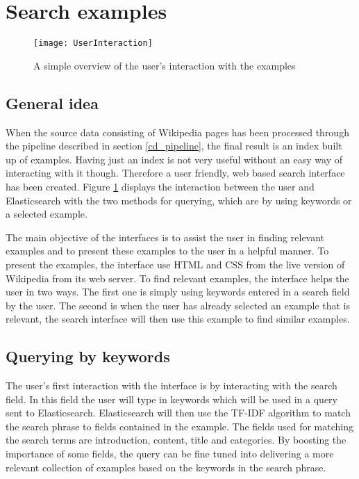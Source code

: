 \section{Search examples}
\begin{figure}[h]
\caption{A simple overview of the user's interaction with the examples}
\texttt{[image: UserInteraction]}
\label{fig:ui}
\end{figure}

\subsection{General idea}
When the source data consisting of Wikipedia pages has been processed through the pipeline described in section \ref{cd_pipeline}, the final result is an index built up of examples. Having just an index is not very useful without an easy way of interacting with it though. Therefore a user friendly, web based search interface has been created. Figure \ref{fig:ui} displays the interaction between the user and Elasticsearch with the two methods for querying, which are by using keywords or a selected example.

The main objective of the interfaces is to assist the user in finding relevant examples and to present these examples to the user in a helpful manner. To present the examples, the interface use HTML and CSS from the live version of Wikipedia from its web server. To find relevant examples, the interface helps the user in two ways. The first one is simply using keywords entered in a search field by the user. The second is when the user has already selected an example that is relevant, the search interface will then use this example to find similar examples.

\subsection{Querying by keywords}

The user's first interaction with the interface is by interacting with the search field. In this field the user will type in keywords which will be used in a query sent to Elasticsearch. Elasticsearch will then use the TF-IDF algorithm to match the search phrase to fields contained in the example. The fields used for matching the search terms are introduction, content, title and categories. By boosting the importance of some fields, the query can be fine tuned into delivering a more relevant collection of examples based on the keywords in the search phrase.


